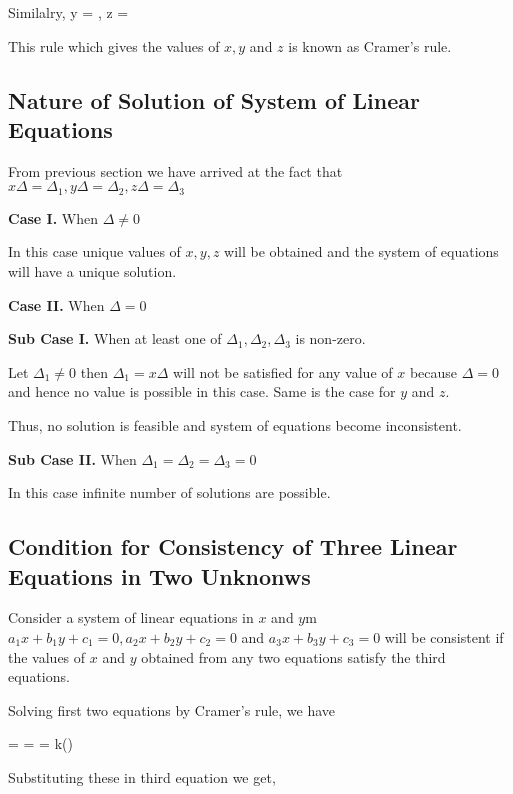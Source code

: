 Similalry, \startformula y = , z = \stopformula

This rule which gives the values of $x, y$ and $z$ is known as Cramer's rule.

\subsection{Nature of Solution of System of Linear Equations}
From previous section we have arrived at the fact that $x\Delta = \Delta_1, y\Delta = \Delta_2, z\Delta = \Delta_3$

{\bf Case I.} When $\Delta \neq 0$

In this case unique values of $x, y, z$ will be obtained and the system of equations will have a unique solution.

{\bf Case II.} When $\Delta = 0$

{\bf Sub Case I.} When at least one of $\Delta_1, \Delta_2, \Delta_3$ is non-zero.

Let $\Delta_1 \neq 0$ then $\Delta_1 = x\Delta$ will not be
satisfied for any value of $x$ because $\Delta = 0$ and hence no
value is possible in this case. Same is the case for $y$ and $z$.

Thus, no solution is feasible and system of equations become inconsistent.

{\bf Sub Case II.} When $\Delta_1 = \Delta_2 = \Delta_3 = 0$

In this case infinite number of solutions are possible.

\subsection{Condition for Consistency of Three Linear Equations in Two Unknonws}
Consider a system of linear equations in $x$ and $y$m $a_1x + b_1y + c_1 = 0, a_2x + b_2y + c_2 = 0$ and $a_3x+ b_3y + c_3 = 0$
will be consistent if the values of $x$ and $y$ obtained from any two equations satisfy the third equations.

Solving first two equations by Cramer's rule, we have

\startformula {} =
 =
 = k()\stopformula

Substituting these in third equation we get,

